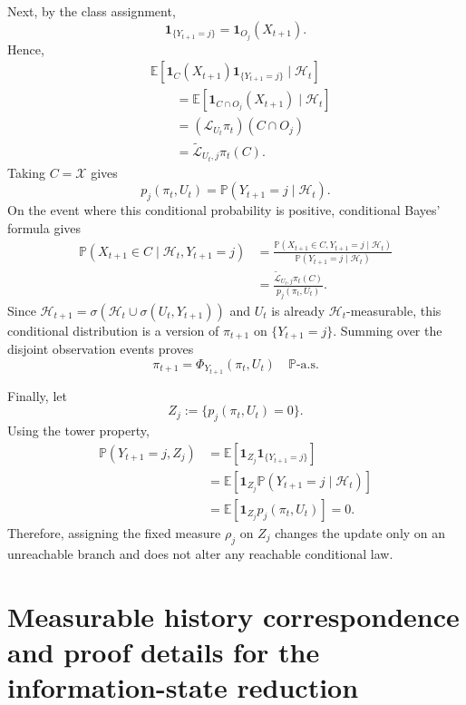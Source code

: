 \documentclass[10pt,twocolumn]{article}
\theoremstyle{remark}
\newcommand{\E}{\mathbb{E}}
\newcommand{\Pp}{\mathbb{P}}
\newcommand{\Hh}{\mathcal{H}}
\newcommand{\Xcal}{\mathcal{X}}
\newcommand{\one}{\mathbf{1}}
\begin{document}
Next, by the class assignment,
\[
\one_{\{Y_{t+1}=j\}}
=
\one_{O_j}(X_{t+1}).
\]
Hence,
\begin{align*}
	&\E[\one_C(X_{t+1})\one_{\{Y_{t+1}=j\}}\mid\Hh_t]\\
	&\qquad=
	\E[\one_{C\cap O_j}(X_{t+1})\mid\Hh_t]\\
	&\qquad=
	(\mathcal L_{U_t}\pi_t)(C\cap O_j)\\
	&\qquad=
	\widetilde{\mathcal L}_{U_t,j}\pi_t(C).
\end{align*}
Taking \(C=\Xcal\) gives
\[
p_j(\pi_t,U_t)
=
\Pp(Y_{t+1}=j\mid\Hh_t).
\]
On the event where this conditional probability is positive, conditional Bayes' formula gives
\begin{align*}
	\Pp(X_{t+1}\in C\mid\Hh_t,Y_{t+1}=j)
	&=\frac{
		\Pp(X_{t+1}\in C,Y_{t+1}=j\mid\Hh_t)}{
		\Pp(Y_{t+1}=j\mid\Hh_t)}\\
	&=\frac{
		\widetilde{\mathcal L}_{U_t,j}\pi_t(C)}{
		p_j(\pi_t,U_t)}.
\end{align*}
Since \(\Hh_{t+1}=\sigma(\Hh_t\cup\sigma(U_t,Y_{t+1}))\) and \(U_t\) is already \(\Hh_t\)-measurable, this conditional distribution is a version of \(\pi_{t+1}\) on \(\{Y_{t+1}=j\}\). Summing over the disjoint observation events proves
\[
\pi_{t+1}=\Phi_{Y_{t+1}}(\pi_t,U_t)
\quad\Pp\text{-a.s.}
\]

Finally, let
\[
Z_j:=\{p_j(\pi_t,U_t)=0\}.
\]
Using the tower property,
\begin{align*}
	\Pp(Y_{t+1}=j,Z_j)
	&=\E\!\left[
	\one_{Z_j}\one_{\{Y_{t+1}=j\}}
	\right]\\
	&=\E\!\left[
	\one_{Z_j}\Pp(Y_{t+1}=j\mid\Hh_t)
	\right]\\
	&=\E[\one_{Z_j}p_j(\pi_t,U_t)]
	=0.
\end{align*}
Therefore, assigning the fixed measure \(\rho_j\) on \(Z_j\) changes the update only on an unreachable branch and does not alter any reachable conditional law.



\section{Measurable history correspondence and proof details for the information-state reduction}
\label{app:information-equivalence-proof}
\end{document}
